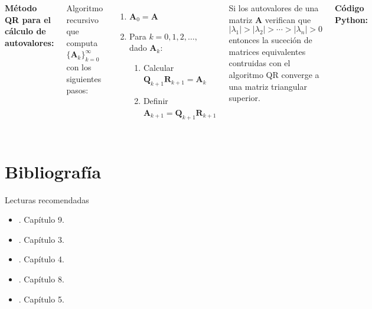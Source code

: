 \documentclass[9pt, aspectratio=169]{beamer}
\begin{document}
\begin{frame}
\begin{columns}[t]
\textbf{Método QR para el cálculo de autovalores:} %

Algoritmo recursivo que computa $\{ \bm{A}_k \}_{k = 0}^{\infty}$ con los siguientes pasos:
\begin{enumerate}
    \item $\bm{A}_0 = \bm{A}$
    \item Para $k = 0, 1, 2, \ldots,$ dado $\bm{A}_k$:
        \begin{enumerate}
        \item Calcular $\bm{Q}_{k+1} \bm{R}_{k+1} = \bm{A}_k $
        \item Definir $\bm{A}_{k+1} = \bm{Q}_{k+1} \bm{R}_{k+1}$
        \end{enumerate}
\end{enumerate} \pause

\begin{theorem}[Convergencia]
    Si los autovalores de una matriz $\bm{A}$ verifican que
    \[ |\lambda_1| > |\lambda_2| > \cdots > |\lambda_n| > 0 \]
    entonces la suceción de matrices equivalentes contruidas con el algoritmo QR converge a una matriz triangular superior.
\end{theorem}

\textbf{Código Python:}

\end{columns}
\end{frame}



\section*{Bibliografía}
\begin{frame}[allowframebreaks]{Lecturas recomendadas}
\begin{itemize}
    \item {}. Capítulo 9.
    \item {}. Capítulo 3.
    \item {}. Capítulo 4.
    \item {}. Capítulo 8.
    \item {}. Capítulo 5.
\end{itemize}
\end{frame}
\end{document}
